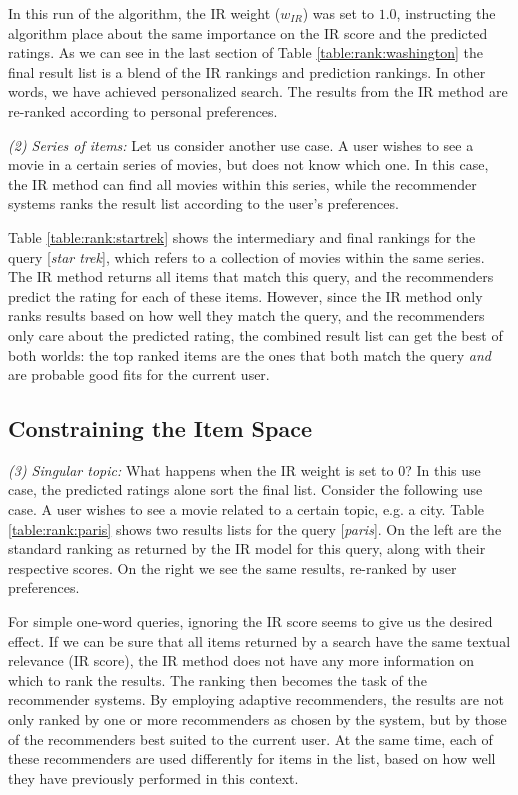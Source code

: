 In this run of the algorithm, the IR weight ($w_{IR}$) was set to $1.0$,
instructing the algorithm place about the same importance on the IR score
and the predicted ratings. As we can see in the last section of 
Table \ref{table:rank:washington} the final result list is a blend
of the IR rankings and prediction rankings.
In other words, we have achieved personalized search. The results
from the IR method are re-ranked according to personal preferences.


\emph{(2) Series of items:} Let us consider another use case.
A user wishes to see a movie in a certain series of movies,
but does not know which one. In this case, the IR method can find all movies within this series,
while the recommender systems ranks the result list according to the user's preferences.

Table \ref{table:rank:startrek} shows the intermediary and final rankings
for the query [\emph{star trek}], which refers to a collection of movies within the same series.
The IR method returns all items that match this query,
and the recommenders predict the rating for each of these items.
However, since the IR method only ranks results based on how well they match the query,
and the recommenders only care about the predicted rating, the combined result
list can get the best of both worlds:
the top ranked items are the ones that both match the query \emph{and}
are probable good fits for the current user.


\subsection{Constraining the Item Space}

\emph{(3) Singular topic:} What happens when the IR weight is set to $0$?
In this use case, the predicted ratings alone sort the final list.
Consider the following use case.
A user wishes to see a movie related to a certain topic, e.g. a city.
Table \ref{table:rank:paris} shows two results lists for the query [\emph{paris}].
On the left are the standard ranking as returned by the IR model for this query,
along with their respective scores.
On the right we see the same results, re-ranked by user preferences.

For simple one-word queries, ignoring the IR score seems to give us the desired effect.
If we can be sure that all items returned by a search have the same textual relevance
(IR score), the IR method does not have any more information on which to rank
the results. The ranking then becomes the task of the recommender systems.
By employing adaptive recommenders, the results are not only ranked by 
one or more recommenders as chosen by the system, but by those of the recommenders
best suited to the current user. At the same time, each of these recommenders
are used differently for items in the list, based on how well they have
previously performed in this context.

